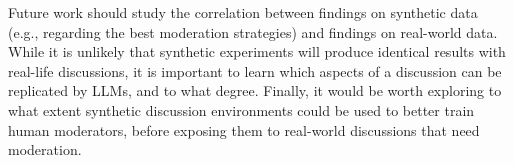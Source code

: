 %

Future work should study the correlation between findings on synthetic data (e.g., regarding the best moderation strategies) and findings on real-world data. While it is unlikely that synthetic experiments will produce identical results with real-life discussions, it is important to learn which aspects of a discussion can be replicated by \acp{LLM}, and to what degree. Finally, it would be worth exploring to what extent synthetic discussion environments could be used to better train human moderators, before exposing them to real-world discussions that need moderation.